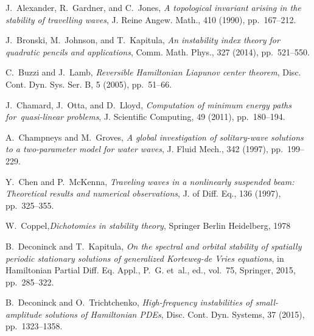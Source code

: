 \documentclass[review,onefignum,onetabnum]{siamart171218}
\begin{document}

%
%


\begin{thebibliography}{10}

{\sc J.~Alexander, R.~Gardner, and C.~Jones}, {\em A topological invariant
  arising in the stability of travelling waves}, J. Reine Angew. Math., 410
  (1990), pp.~167--212.

{\sc J.~Bronski, M.~Johnson, and T.~Kapitula}, {\em An instability index theory
  for quadratic pencils and applications}, Comm. Math. Phys., 327 (2014),
  pp.~521--550.

{\sc C.~Buzzi and J.~Lamb}, {\em Reversible {H}amiltonian {L}iapunov center
  theorem}, Disc. Cont. Dyn. Sys. Ser. B, 5 (2005), pp.~51--66.

{\sc J.~Chamard, J.~Otta, and D.~Lloyd}, {\em Computation of minimum energy
  paths for~quasi-linear problems}, J. Scientific Computing, 49 (2011),
  pp.~180--194.

{\sc A.~Champneys and M.~Groves}, {\em A global investigation of solitary-wave
  solutions to a two-parameter model for water waves}, J. Fluid Mech., 342
  (1997), pp.~199--229.

{\sc Y.~Chen and P.~McKenna}, {\em Traveling waves in a nonlinearly suspended
  beam: Theoretical results and numerical observations}, J. of Diff. Eq., 136
  (1997), pp.~325--355.

{\sc W.~Coppel},{\em Dichotomies in stability theory}, Springer Berlin Heidelberg, 1978

{\sc B.~Deconinck and T.~Kapitula}, {\em On the spectral and orbital stability
  of spatially periodic stationary solutions of generalized {K}orteweg-de
  {V}ries equations}, in Hamiltonian Partial Diff. Eq. Appl., P.~G. et~al.,
  ed., vol.~75, Springer, 2015, pp.~285--322.

{\sc B.~Deconinck and O.~Trichtchenko}, {\em High-frequency instabilities of
  small-amplitude solutions of {H}amiltonian {PDE}s}, Disc. Cont. Dyn. Systems,
  37 (2015), pp.~1323--1358.


\end{thebibliography}
\end{document}
